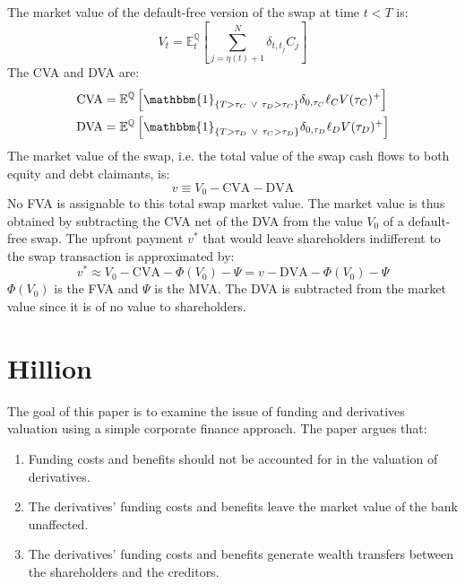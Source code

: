 \documentclass[10pt,a4paper]{article}
\begin{document}
            The market value of the default-free version of the swap at time $t<T$ is:
                \begin{equation}
                    V_{t} = \mathbb{E}_{t}^{\mathbb{Q}}\left[\sum_{j=\eta(t)+1}^{N} \delta_{t,t_{j}}C_{j}\right] 
                \end{equation}
            The CVA and DVA are:
                \begin{align}
                    \text{CVA} &= \mathbb{E}^{\mathbb{Q}}\left[
                        \mathbbm{1}_{\{T > \tau_{C} ~\vee~ \tau_{D} > \tau_{C}\}} \delta_{0,\tau_{C}} \ell_{C} V(\tau_{C})^{+}
                    \right]  \\
                    \text{DVA} &= \mathbb{E}^{\mathbb{Q}}\left[
                        \mathbbm{1}_{\{T > \tau_{D} ~\vee~ \tau_{C} > \tau_{D}\}} \delta_{0,\tau_{D}} \ell_{D} V(\tau_{D})^{+}
                    \right] 
                \end{align}
            The market value of the swap, i.e. the total value of the swap cash flows to both equity and debt claimants, is:
                \begin{equation}
                    v \equiv V_{0} - \text{CVA} - \text{DVA}
                \end{equation}
            No FVA is assignable to this total swap market value. The market value is thus obtained by subtracting the CVA net of the DVA from the value $V_{0}$ of a default-free swap. The upfront payment $v^{\ast}$ that would leave shareholders indifferent to the swap transaction is approximated by:
                \begin{equation}
                    v^{\ast} \approx V_{0} - \text{CVA} - \Phi(V_{0}) - \Psi = v - \text{DVA} - \Phi(V_{0}) - \Psi
                \end{equation}
            $\Phi(V_{0})$ is the FVA and $\Psi$ is the MVA. The DVA is subtracted from the market value since it is of no value to shareholders. 
        
    \section{Hillion}
        The goal of this paper is to examine the issue of funding and derivatives valuation using a simple corporate finance approach. The paper argues that:
            \begin{enumerate}
                \item Funding costs and benefits should not be accounted for in the valuation of derivatives.
                \item The derivatives' funding costs and benefits leave the market value of the bank unaffected.
                \item The derivatives' funding costs and benefits generate wealth transfers between the shareholders and the creditors.
            \end{enumerate}
\end{document}
